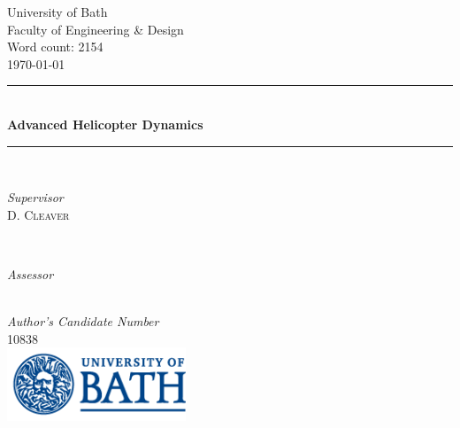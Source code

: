 \documentclass[11pt]{article}
\begin{document}
 

	\begin{titlepage}
	\thispagestyle{empty}
		\newcommand{\HRule}{\rule{\linewidth}{0.5mm}}	
		\center
		\LARGE 
		University of Bath\\
	 	Faculty of Engineering \& Design\\[1cm]	
		\large
		Word count: 2154\\[0.5cm]
		{\large\today}\\[1cm]	
		\HRule\\[0.4cm]	
		{\LARGE \bfseries Advanced Helicopter Dynamics}\\[0.3cm] 	
		\HRule\\[1cm]	
		\begin{minipage}{0.4\textwidth}
			\begin{flushleft}
				\large
				\textit{Supervisor}\\
				D. \textsc{Cleaver}
			\end{flushleft}
		\end{minipage}
		~
		\begin{minipage}{0.4\textwidth}
			\begin{flushright}
				\large
				\textit{Assessor}\\
				
			\end{flushright}
		\end{minipage}\\[1.4cm]
		\large
		\textit{Author's Candidate Number}\\
		10838\\
		\vfill
		\includegraphics[width=0.4\textwidth]{UOB_Logo.png}\\
		\vfill 
	\end{titlepage}




\thispagestyle{empty}




\tableofcontents
\thispagestyle{empty}
\listoffigures
\listoftables

\end{document}
